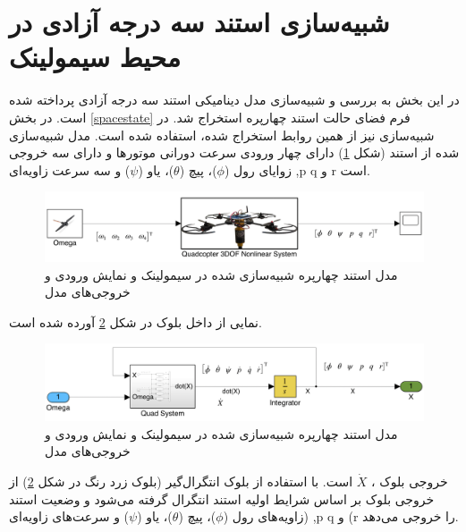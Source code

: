 \section{شبیه‌سازی استند سه درجه آزادی در محیط سیمولینک}\label{quadall3}
در این بخش به بررسی و شبیه‌سازی مدل دینامیکی استند سه درجه آزادی پرداخته شده است. در بخش \ref{spacestate} فرم فضای حالت استند چهارپره استخراج شد. در شبیه‌سازی نیز از همین روابط استخراج شده، استفاده شده است. مدل شبیه‌سازی شده از استند (شکل \ref{quadsimulink}) دارای چهار ورودی سرعت دورانی موتورها  و دارای سه خروجی زوایای رول ($\phi$)، پیچ ($\theta$)، یاو ($\psi$) و  سه سرعت زاویه‌ای
 ,p
q
 و 
r 
 است.
 
 
\begin{figure}[H]
	\includegraphics[width=16cm]{../../Figures/QuadSimulation/Stand_Model.png}
	\centering
	\vspace*{-15mm}
	\caption{مدل استند چهارپره شبیه‌سازی شده در سیمولینک و نمایش ورودی و خروجی‌های مدل}
	\label{quadsimulink}
\end{figure}
نمایی از داخل بلوک
در شکل \ref{Quad3DOF} آورده شده است.
\begin{figure}[H]
	\includegraphics[width=16cm]{../../Figures/QuadSimulation/Integrator.png}
	\centering
	\vspace*{-15mm}
	\caption{مدل استند چهارپره شبیه‌سازی شده در سیمولینک و نمایش ورودی و خروجی‌های مدل}
	\label{Quad3DOF}
\end{figure}
خروجی بلوک
،
$\dot X$
است. با استفاده از بلوک انتگرال‌گیر (بلوک زرد رنگ در شکل \ref{Quad3DOF})
از خروجی بلوک بر اساس شرایط اولیه استند انتگرال گرفته می‌شود و وضعیت استند (زاویه‌های رول ($\phi$)، پیچ ($\theta$)، یاو ($\psi$) و سرعت‌های زاویه‌ای‌
,p
q
و 
(r
را خروجی می‌دهد.

